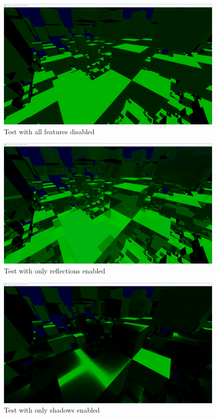 \documentclass[times, utf8, zavrsni, numeric]{fer}
\begin{document}
\begin{center}
\begin{figure}[H]
\includegraphics[width=1\textwidth]{tests/all_off.png}
\caption{Test with all features disabled}
\label{image:all_off}
\end{figure}
\end{center}

\begin{center}
\begin{figure}[H]
\includegraphics[width=1\textwidth]{tests/reflections_only.png}
\caption{Test with only reflections enabled}
\end{figure}
\end{center}

\begin{center}
\begin{figure}[H]
\includegraphics[width=1\textwidth]{tests/shadows_only.png}
\caption{Test with only shadows enabled}
\end{figure}
\end{center}
\end{document}

